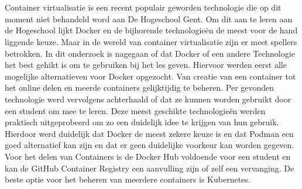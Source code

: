 
%
%

%



\chapter*{}

Container virtualisatie is een recent populair geworden technologie die op dit moment niet behandeld word aan De Hogeschool Gent. Om dit aan te leren aan de Hogeschool lijkt Docker en de bijhorende technologieën de meest voor de hand liggende keuze. Maar in de wereld van container virtualisatie zijn er meet spellers betrokken. In dit onderzoek is nagegaan of dat Docker of een andere Technologie het best gehikt is om te gebruiken bij het les geven. Hiervoor werden eerst alle mogelijke alternatieven voor Docker opgezocht.  Van creatie van een container tot het online delen en meerde containers gelijktijdig te beheren.
Per gevonden technologie werd vervolgens achterhaald of dat ze kunnen worden gebruikt door een student om mee te leren. Deze meest geschikte technologieën werden praktisch uitgeprobeerd om zo een duidelijk idee te krijgen van hun gebruik. Hierdoor werd duidelijk dat Docker de meest zekere keuze is en dat Podman een goed alternatief kan zijn en dat er geen duidelijke voorkeur kan worden gegeven. Voor het delen van Containers is de Docker Hub voldoende voor een student en kan de GitHub Container Registry een aanvulling zijn of zelf een vervanging. De beste optie voor het beheren van meerdere containers is Kubernetes.
